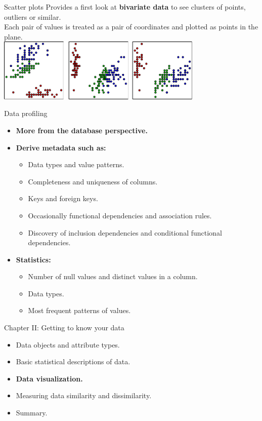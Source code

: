 \documentclass[aspectratio=169,t]{beamer}
\begin{document}
  { 
    \begin{frame}{Scatter plots}
    Provides a first look at \textbf{bivariate data} to see clusters of points, outliers or similar.\\
    Each pair of values is treated as a pair of coordinates and plotted as points in the plane.\\[0.5cm]
    \centering
    \includegraphics[height=3cm]{img/scatterplot.pdf}
    \end{frame}
  }

  { 
    \begin{frame}{Data profiling}
    \begin{itemize}
      \item \textbf{More from the database perspective.}
      \item \textbf{Derive metadata such as:}
      \begin{itemize}
        \item Data types and value patterns.
        \item Completeness and uniqueness of columns.
        \item Keys and foreign keys.
        \item Occasionally functional dependencies and association rules.
        \item Discovery of inclusion dependencies and conditional functional dependencies.
      \end{itemize}
      \item \textbf{Statistics:}
      \begin{itemize}
        \item Number of null values and distinct values in a column.
        \item Data types.
        \item Most frequent patterns of values.
      \end{itemize}
    \end{itemize}
    \end{frame}
  }

  { 
    \begin{frame}{Chapter II: Getting to know your data}
    \begin{itemize}
      \item Data objects and attribute types.
      \item Basic statistical descriptions of data.
      \item \textbf{Data visualization.}
      \item Measuring data similarity and dissimilarity.
      \item Summary.
    \end{itemize}
    \end{frame}
  }
\end{document}
